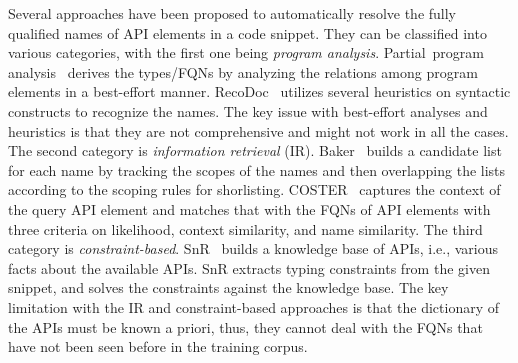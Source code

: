 Several approaches have been proposed to automatically resolve the fully qualified names of API elements in a code snippet. They can be classified into various categories, with the first one being {\em program analysis}. 
Partial~program analysis~\cite{dagenais-oopsla08} derives the types/FQNs by analyzing the relations among program elements in a best-effort manner. RecoDoc~\cite{dagenais-icse12} utilizes several heuristics on syntactic constructs to recognize the names. The key issue with best-effort analyses and heuristics is that they are not comprehensive and might not work in all the cases. The second category is {\em information retrieval} (IR). Baker~\cite{liveapi14} builds a candidate list for each name by tracking the scopes of the names and then overlapping the lists according to the scoping rules for shorlisting. COSTER~\cite{coster-ase19} captures the context of the query API element and matches that with the FQNs of API elements with three criteria on likelihood, context similarity, and name similarity.  The third category is {\em constraint-based}. SnR~\cite{snr-icse22} builds a knowledge base of APIs, i.e., various facts about the available APIs. SnR extracts typing constraints from the given snippet, and solves the constraints against the knowledge base. The key limitation with the IR and constraint-based approaches is that the dictionary of the APIs must be known a priori, thus, they cannot deal with the FQNs  that have not been seen before in the training corpus.

